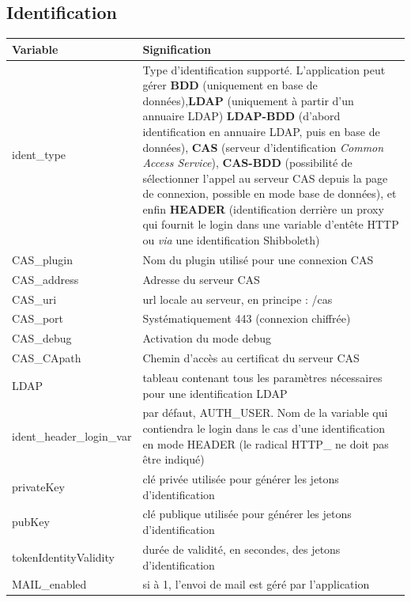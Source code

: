 \subsection{Identification}\label{paramident}
\begin{longtable}{|p{5cm}|p{8cm}|}
\hline
\textbf{Variable} & \textbf{Signification} \\
\hline
\endhead
\hline
\endfoot
\endlastfoot
ident\_type & Type d'identification supporté. L'application peut gérer \textbf{BDD} (uniquement en base de données),\textbf{LDAP} (uniquement à partir d'un annuaire LDAP) \textbf{LDAP-BDD} (d'abord identification en annuaire LDAP, puis en base de données), \textbf{CAS} (serveur d'identification \textit{Common Access Service}), \textbf{CAS-BDD} (possibilité de sélectionner l'appel au serveur CAS depuis la page de connexion, possible en mode base de données), et enfin \textbf{HEADER} (identification derrière un proxy qui fournit le login dans une variable d'entête HTTP ou \textit{via} une identification Shibboleth)\\
CAS\_plugin & Nom du plugin utilisé pour une connexion CAS \\
CAS\_address & Adresse du serveur CAS\\
CAS\_uri & url locale au serveur, en principe : /cas \\
CAS\_port & Systématiquement 443 (connexion chiffrée)\\
CAS\_debug & Activation du mode debug \\
CAS\_CApath & Chemin d'accès au certificat du serveur CAS \\
LDAP & tableau contenant tous les paramètres nécessaires pour une identification LDAP \\
ident\_header\_login\_var & par défaut, AUTH\_USER. Nom de la variable qui contiendra le login dans le cas d'une identification en mode HEADER (le radical HTTP\_  ne doit pas être indiqué) \\

privateKey & clé privée utilisée pour générer les jetons d'identification \\

pubKey & clé publique utilisée pour générer les jetons d'identification \\

tokenIdentityValidity & durée de validité, en secondes, des jetons d'identification\\

MAIL\_enabled & si à 1, l'envoi de mail est géré par l'application \\


\end{longtable}
